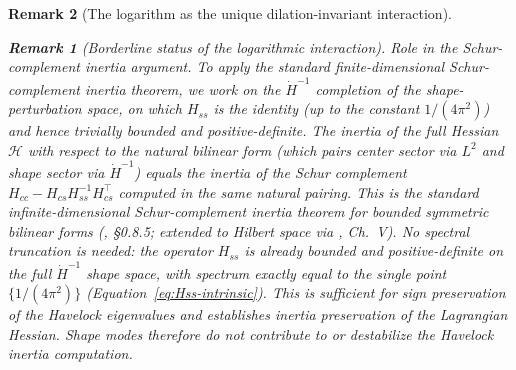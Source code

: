 \documentclass[12pt, a4paper]{article}
\newtheorem{remark}{Remark}[section]
\numberwithin{equation}{section}
\begin{document}
\begin{remark}[The logarithm as the unique dilation-invariant interaction]
\begin{remark}[Borderline status of the logarithmic interaction]
\emph{Role in the Schur-complement inertia argument.}
To apply the standard finite-dimensional Schur-complement inertia
theorem, we work on the $\dot H^{-1}$ completion of the
shape-perturbation space, on which $H_{ss}$ is the identity (up to
the constant $1/(4\pi^2)$) and hence trivially bounded and
positive-definite.  The inertia of the full Hessian $\mathcal{H}$
with respect to the natural bilinear form (which pairs center
sector via $L^2$ and shape sector via $\dot H^{-1}$) equals the
inertia of the Schur complement $H_{cc} - H_{cs} H_{ss}^{-1}
H_{cs}^\top$ computed in the same natural pairing.  This is the
standard infinite-dimensional Schur-complement inertia theorem for
bounded symmetric bilinear forms (\citealt{HornJohnson2012},
\S0.8.5; extended to Hilbert space via \citealt{Kato1995}, Ch.~V).
No spectral truncation is needed: the operator $H_{ss}$ is already
bounded and positive-definite on the full $\dot H^{-1}$ shape space,
with spectrum exactly equal to the single point $\{1/(4\pi^2)\}$
(Equation~\eqref{eq:Hss-intrinsic}).  This is sufficient
for sign preservation of the Havelock eigenvalues and establishes
inertia preservation of the Lagrangian Hessian.  Shape modes
therefore do not contribute to or destabilize the Havelock
inertia computation.


\end{remark}
\end{remark}
\end{document}
